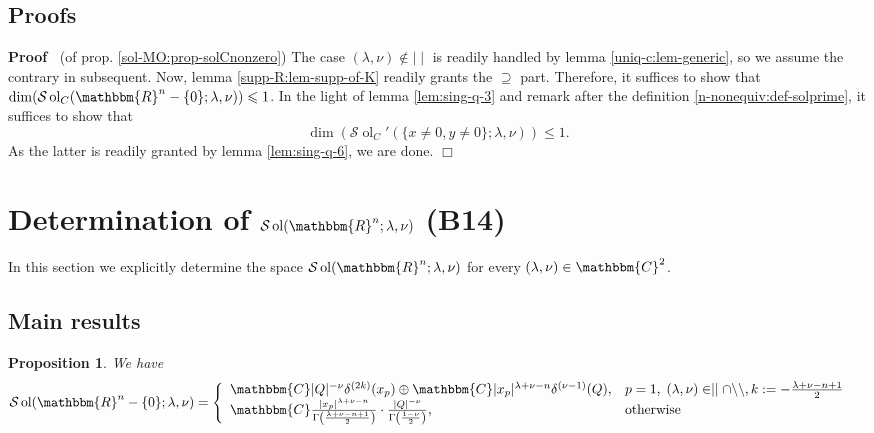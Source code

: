 \documentclass{article}
\newcommand{\nin}{\not\in}
\newcommand{\tmop}[1]{\ensuremath{\operatorname{#1}}}
\renewenvironment{proof}{\noindent\textbf{Proof\ }}{\hspace*{\fill}$\Box$\medskip}
\newtheorem{proposition}{Proposition}[section]
\theoremstyle{remark}
\begin{document}
\subsection{Proofs}

\begin{proof}
  (of prop. \ref{sol-MO:prop-solCnonzero}) The case $(\lambda, \nu) \nin \mid
  \mid$ is readily handled by lemma \ref{uniq-c:lem-generic}, so we assume the
  contrary in subsequent. Now, lemma \ref{supp-R:lem-supp-of-K} readily grants
  the $\supseteq$ part. Therefore, it suffices to show that $\dim (\mathcal{S}
  \tmop{ol}_C (\mathbbm{R}^n - \{ 0 \} ; \lambda, \nu)) \leqslant 1$. In the
  light of lemma \ref{lem:sing-q-3} and remark after the definition
  \ref{n-nonequiv:def-solprime}, it suffices to show that
  \[ \dim (\mathcal{S} \tmop{ol}_C' (\{ x \neq 0, y \neq 0 \} ; \lambda,
     \nu)) \leqslant 1. \]
  As the latter is readily granted by lemma \ref{lem:sing-q-6}, we are done.
\end{proof}

\section{Determination of $\mathcal{S} \tmop{ol} (\mathbbm{R}^n ; \lambda,
\nu)$ (B14)}\label{sec:sol-MO}

In this section we explicitly determine the space $\mathcal{S} \tmop{ol}
(\mathbbm{R}^n ; \lambda, \nu)$ for every $(\lambda, \nu) \in \mathbbm{C}^2$.

\subsection{Main results}

\begin{proposition}
  \label{sol-MO:prop-solonnonzero}We have
  \begin{eqnarray}
    & \mathcal{S} \tmop{ol} (\mathbbm{R}^n - \{ 0 \} ; \lambda, \nu) =
    \left\{ \begin{array}{ll}
      \mathbbm{C} | Q |^{- \nu} \delta^{(2 k)} (x_p) \oplus \mathbbm{C} | x_p
      |^{\lambda + \nu - n} \delta^{(\nu - 1)} (Q), & p = 1, \; (\lambda, \nu)
      \in \mid \mid \cap \backslash\backslash, k : = - \frac{\lambda + \nu - n
      + 1}{2}\\
      \mathbbm{C} \frac{| x_p |^{\lambda + \nu - n}}{\Gamma \left(
      \frac{\lambda + \nu - n + 1}{2} \right)} \cdot \frac{| Q |^{-
      \nu}}{\Gamma \left( \frac{1 - \nu}{2} \right)}, & \tmop{otherwise}
    \end{array} \right. &  \nonumber
  \end{eqnarray}
\end{proposition}
\end{document}
